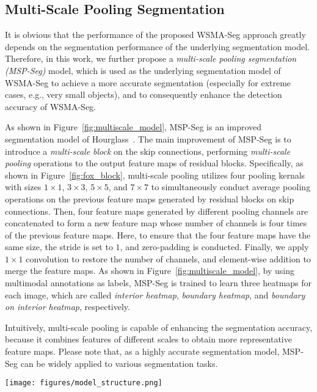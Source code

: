 \documentclass{article}
\begin{document}
\subsection{Multi-Scale Pooling Segmentation}
It is obvious that the performance of the proposed WSMA-Seg approach  greatly depends on the segmentation performance of the underlying segmentation model. Therefore, in this work, we further propose a \emph{multi-scale pooling segmentation (MSP-Seg)} model, which is used as the underlying segmentation model of WSMA-Seg to achieve a more accurate segmentation (especially for extreme cases, e.g., very small objects), and to consequently enhance the detection accuracy of WSMA-Seg. 

As shown in Figure~\ref{fig:multiscale_model}, MSP-Seg is an improved segmentation model of Hourglass~\cite{newell2016stacked}. The main improvement of MSP-Seg is to introduce a \emph{multi-scale block} on the skip connections, performing \emph{multi-scale pooling} operations to the output feature maps of residual blocks. Specifically, as shown in Figure~\ref{fig:fox_block}, multi-scale pooling utilizes four pooling kernals with sizes $1\times 1$, $3\times 3$, $5 \times 5$, and $7\times 7$ to simultaneously conduct average pooling operations on the previous feature maps generated by residual blocks on skip connections. Then, four feature maps generated by different pooling channels are concatenated to form a new feature map whose number of channels is four times of the previous feature maps. Here, to ensure that the four feature maps have the same size, the stride is set to $1$, and zero-padding is conducted. Finally, we apply $1\times 1$ convolution  to restore the number of channels, and element-wise addition to merge the feature maps. As shown in Figure~\ref{fig:multiscale_model}, by using multimodal annotations as labels, MSP-Seg is trained to learn three heatmaps for each image, which are called \emph{interior heatmap}, \emph{boundary heatmap}, and \emph{boundary on interior heatmap}, respectively.

Intuitively, multi-scale pooling is capable of enhancing the segmentation accuracy, because it combines features of different scales to obtain more representative feature maps. Please note that, as a highly accurate segmentation model, MSP-Seg can be widely applied to  various segmentation tasks.



\begin{figure*}
  \centering
  \texttt{[image: figures/model\_structure.png]}
  \caption{Multi-scale pooling segmentation model.\label{fig:multiscale_model}}
\end{figure*}
\end{document}
